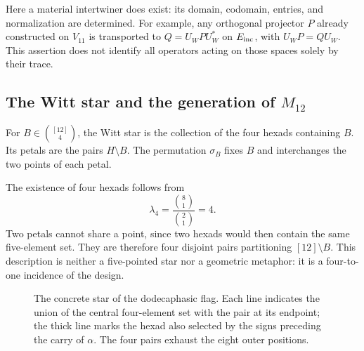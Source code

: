 Here a material intertwiner does exist: its domain, codomain,
entries, and normalization are determined. For example, any
orthogonal projector $P$ already constructed on $V_{11}$ is transported to
$Q=U_WPU_W^*$ on $E_{\rm inc}$, with
$U_WP=QU_W$. This assertion does not identify all
operators acting on those spaces solely by their trace.

\subsection{The Witt star and the generation of \texorpdfstring{$M_{12}$}{M12}}
\label{exc:estrella}

\begin{definition}
\label{exc:def-estrella}
For $B\in\binom{[12]}4$, the Witt star is the collection of the
four hexads containing $B$. Its petals are the pairs $H\setminus B$.
The permutation $\sigma_B$ fixes $B$ and interchanges the two points of each
petal.
\end{definition}

The existence of four hexads follows from
\[
 \lambda_4=\frac{\binom81}{\binom21}=4.
\]
Two petals cannot share a point, since two hexads would then
contain the same five-element set. They are therefore four disjoint pairs
partitioning $[12]\setminus B$. This description is neither a five-pointed
star nor a geometric metaphor: it is a four-to-one
incidence of the design.

\begin{figure}[htbp]
\centering
{}
\caption{The concrete star of the dodecaphasic flag. Each line
indicates the union of the central four-element set with the pair at its endpoint; the
thick line marks the hexad also selected by the signs
preceding the carry of $\alpha$. The four pairs exhaust the eight
outer positions.}
\label{exc:fig-estrella}
\end{figure}

